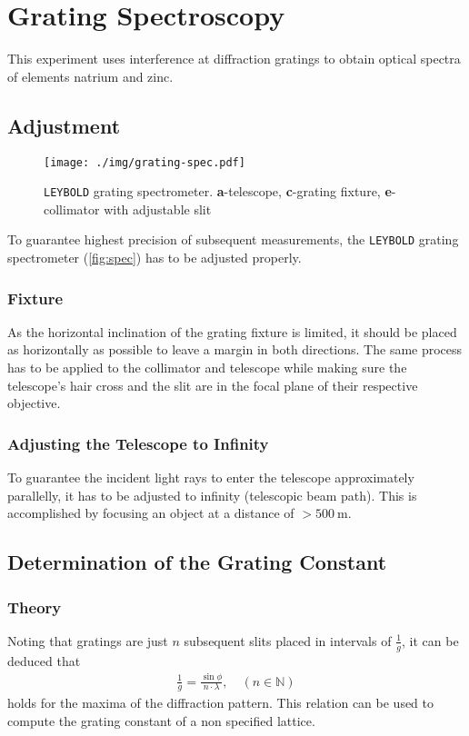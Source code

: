 \chapter{Grating Spectroscopy}
This experiment uses interference at diffraction gratings to obtain optical spectra of elements natrium and zinc.

\section{Adjustment}
\begin{figure}
	\centering
	\texttt{[image: ./img/grating-spec.pdf]}
	\caption[\texttt{LEYBOLD} grating spectrometer]{\texttt{LEYBOLD} grating spectrometer. \textbf{a}-telescope, \textbf{c}-grating fixture, \textbf{e}-collimator with adjustable slit}
	\label{fig:spec}
\end{figure}
To guarantee highest precision of subsequent measurements, the \texttt{LEYBOLD} grating spectrometer (\autoref{fig:spec}) has to be adjusted properly.

\subsection{Fixture}
As the horizontal inclination of the grating fixture is limited, it should be placed as horizontally as possible to leave a margin in both directions.
The same process has to be applied to the collimator and telescope while making sure the telescope's hair cross and the slit are in the focal plane of their respective objective.

\subsection{Adjusting the Telescope to Infinity}
To guarantee the incident light rays to enter the telescope approximately parallelly, it has to be adjusted to infinity (telescopic beam path).
This is accomplished by focusing an object at a distance of $>\SI{500}{\meter}$.

\section{Determination of the Grating Constant}\label{sec:grating}
\subsection{Theory}
Noting that gratings are just $n$ subsequent slits placed in intervals of $\frac{1}{g}$, it can be deduced that
\begin{align}
	\frac{1}{g}=\frac{\sin\phi}{n\cdot\lambda},\quad(n\in\mathbb{N}) \label{eq:grating-const}
\end{align}
holds for the maxima of the diffraction pattern.
This relation can be used to compute the grating constant of a non specified lattice.
